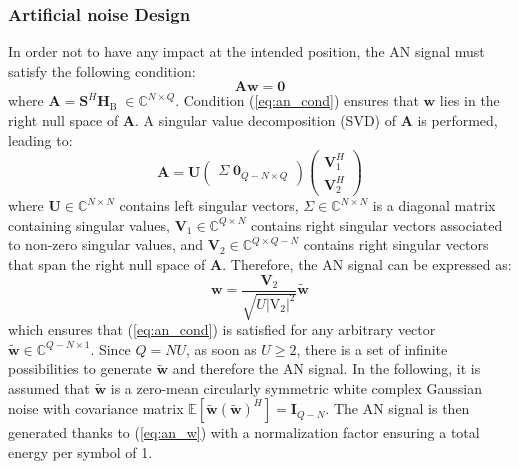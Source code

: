 \documentclass[journal,comsoc]{IEEEtran}
\newcommand{\EX}[1]{\mathbb{E} \left[#1\right]}%
\newcommand{\HB}{\textbf{H}_{\text{B}}}
\newcommand{\spread}{\textbf{S}}
\newcommand{\w}{\textbf{w}}
\newcommand{\mat}[1]{\boldsymbol{\mathrm{#1}}}
\newcommand{\C}{\mathbb{C}}
\begin{document}
\subsubsection{Artificial noise Design}\label{sec:artificial-noise-design}
In order not to have any impact at the intended position, the AN signal must satisfy the following condition:
\begin{equation}
	\textbf{A} \w \; = \; \textbf{0}
	\label{eq:an_cond}
\end{equation}
where $\textbf{A} = \spread^H\HB\; \in \C^{N\times Q}$. Condition (\ref{eq:an_cond}) ensures that $\w$ lies in the right null space of $\textbf{A}$. A singular value decomposition (SVD) of $\textbf{A}$ is performed, leading to:
\begin{equation}
	\textbf{A} = \textbf{U} 
	\begin{pmatrix}
		\Sigma \; \textbf{0}_{Q-N\times Q}
	\end{pmatrix}
	\begin{pmatrix}
		\textbf{V}_1^H \\
		\textbf{V}_2^H
	\end{pmatrix}
	\label{eq:an_svd}
\end{equation}
where $\textbf{U} \in \C^{N \times N}$ contains left singular vectors, $\Sigma \in \C^{N \times N}$ is a diagonal matrix containing singular values, $\textbf{V}_1 \in \C^{Q \times N}$ contains right singular vectors associated to non-zero singular values, and $\textbf{V}_2 \in \C^{Q \times Q-N}$ contains right singular vectors that span the right null space of $\textbf{A}$. Therefore, the AN signal can be expressed as:
\begin{equation}
	\w = \frac{\textbf{V}_2}{\sqrt{U |\mat{V_2}|^2}} \tilde{\w}
	\label{eq:an_w}
\end{equation}
which ensures that (\ref{eq:an_cond}) is satisfied for any arbitrary vector $\tilde{\w} \in \C^{Q-N \times 1}$. Since $Q = NU$, as soon as $U\geq 2$, there is a set of infinite possibilities to generate $\tilde{\w}$ and therefore the AN signal. In the following, it is assumed that $\tilde{\w}$ is a zero-mean circularly symmetric white complex Gaussian noise with covariance matrix $\EX{\tilde{\w}(\tilde{\w})^H} = \textbf{I}_{Q-N }$. The AN signal is then generated thanks to (\ref{eq:an_w}) with a normalization factor ensuring a total energy per symbol of 1.
\end{document}
